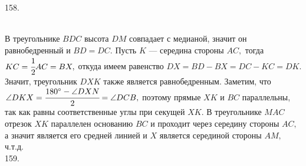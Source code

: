 \documentclass[12pt]{article}
\begin{document}
158. \begin{figure}[ht!]
\end{figure}\\
В треугольнике $BDC$ высота $DM$ совпадает с медианой, значит он равнобедренный и $BD=DC.$ Пусть $K$ --- середина стороны $AC,$ тогда $KC=\cfrac{1}{2} AC=BX,$ откуда имеем равенство $DX=BD-BX=DC-KC=DK.$ Значит, треугольник $DXK$ также является равнобедренным. Заметим, что $\angle DKX=\cfrac{180^\circ-\angle DXN}{2}=\angle DCB,$ поэтому прямые $XK$ и $BC$ параллельны, так как равны соответственные углы при секущей $XK.$ В треугольнике $MAC$ отрезок $XK$ параллелен основанию $BC$ и проходит через середину стороны $AC,$ а значит является его средней линией и $X$ является серединой стороны $AM,$ ч.т.д.\\
159. \begin{figure}[ht!]
\end{figure}\\
\end{document}
